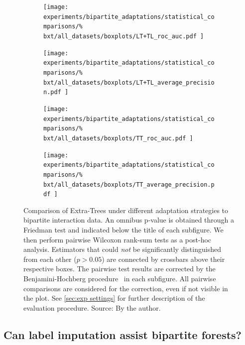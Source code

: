 \begin{figure}[tb]
    \centering
    \begin{subfigure}{0.49\textwidth}
        \texttt{[image: 
            experiments/bipartite\_adaptations/statistical\_comparisons/\%
            bxt/all\_datasets/boxplots/LT+TL\_roc\_auc.pdf
        ]}
    \end{subfigure}
    \begin{subfigure}{0.49\textwidth}
        \texttt{[image: 
            experiments/bipartite\_adaptations/statistical\_comparisons/\%
            bxt/all\_datasets/boxplots/LT+TL\_average\_precision.pdf
        ]}
    \end{subfigure}

    \begin{subfigure}{0.49\textwidth}
        \texttt{[image: 
            experiments/bipartite\_adaptations/statistical\_comparisons/\%
            bxt/all\_datasets/boxplots/TT\_roc\_auc.pdf
        ]}
    \end{subfigure}
    \begin{subfigure}{0.49\textwidth}
        \texttt{[image: 
            experiments/bipartite\_adaptations/statistical\_comparisons/\%
            bxt/all\_datasets/boxplots/TT\_average\_precision.pdf
        ]}
    \end{subfigure}
    \caption{
        Comparison of Extra-Trees under different adaptation strategies to bipartite interaction data.
        An omnibus p-value is obtained through a Friedman test and indicated below the title of each subfigure.
        We then perform pairwise Wilcoxon rank-sum tests as a post-hoc analysis.
        Estimators that could \emph{not} be significantly distinguished from each other ($p > 0.05$) are connected by crossbars above their respective boxes. 
        The pairwise test results are corrected by the Benjamini-Hochberg procedure~\cite{benjamini1995controlling,haynes2013benjamini} in each subfigure. All pairwise comparisons are considered for the correction, even if not visible in the plot.
        See \autoref{sec:exp settings} for further description of the evaluation procedure. \newline Source: By the author.
    }
    \label{fig:adaptations_bxt}
\end{figure}


\subsection{Can label imputation assist bipartite forests?}
\label{sec:y_reconstruction}

